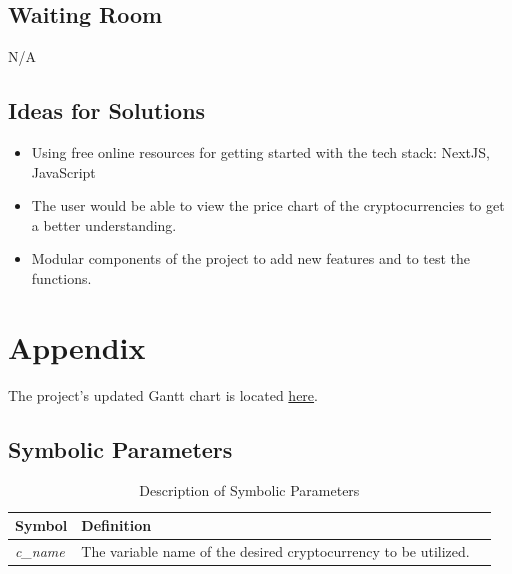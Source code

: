 \documentclass[12pt, titlepage]{article}
\begin{document}
\subsection{Waiting Room}
N/A

\subsection{Ideas for Solutions}
\begin{itemize}
    \item Using free online resources for getting started with the tech stack: NextJS, JavaScript
    \item The user would be able to view the price chart of the cryptocurrencies to get a better understanding. 
    \item Modular components of the project to add new features and to test the functions. 
\end{itemize}

\newpage

\section{Appendix}

The project's updated Gantt chart is located \href{https://gitlab.cas.mcmaster.ca/webapp/webapp_l02_grp15/-/tree/main/ProjectSchedule}{here}.

\subsection{Symbolic Parameters}

\begin{table}[!h]
    \begin{tabular}{lll} \toprule
        \textbf{Symbol} & \textbf{Definition}\\ \midrule
        \textit{c\_name} & The variable name of the desired cryptocurrency to be utilized. \\ 
        \bottomrule
    \end{tabular}
    \caption{Description of Symbolic Parameters}
    \label{tab:my_label}
\end{table}


\nocite{*}

\end{document}
